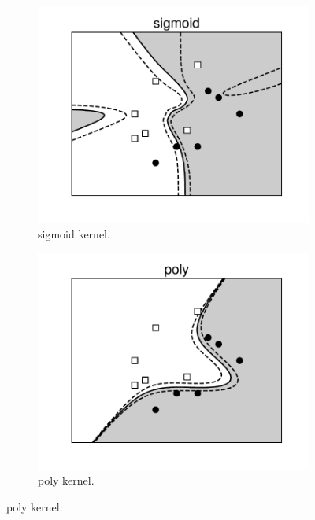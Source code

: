 \begin{figure}[t]
    \begin{subfigure}{0.325\textwidth}
    \includegraphics[width=\linewidth]{Chapters/09_SupportVectorMachines/21_kernelsvm/plt/sigmoid3.pdf}
    \caption{sigmoid kernel.}
    \end{subfigure}
    \begin{subfigure}{0.325\textwidth}
    \includegraphics[width=\linewidth]{Chapters/09_SupportVectorMachines/21_kernelsvm/plt/poly3.pdf}
    \caption{poly kernel.}
    \end{subfigure}

\end{figure}
